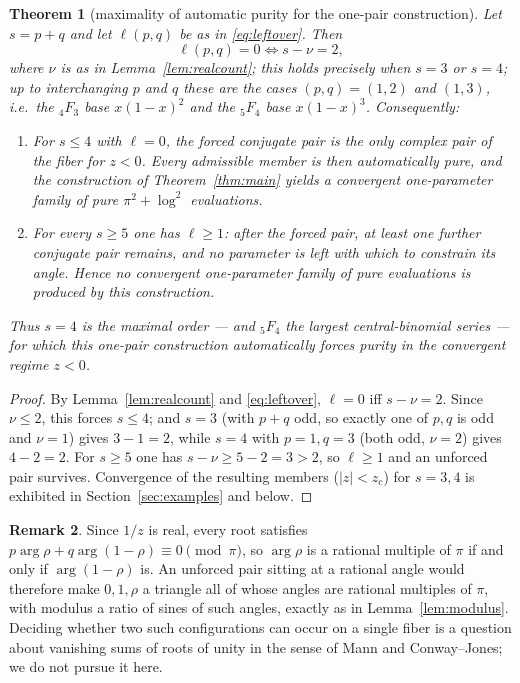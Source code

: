 \documentclass[11pt]{article}
\newtheorem{theorem}{Theorem}
\theoremstyle{definition}
\newtheorem{remark}[theorem]{Remark}
\begin{document}
\begin{theorem}[maximality of automatic purity for the one-pair construction]\label{thm:boundary}
Let $s=p+q$ and let $\ell(p,q)$ be as in \eqref{eq:leftover}. Then
\[
  \ell(p,q)=0 \iff s-\nu=2 ,
\]
where $\nu$ is as in Lemma~\ref{lem:realcount}; this holds precisely when $s=3$ or $s=4$; up to interchanging $p$ and $q$ these are the cases
$(p,q)=(1,2)$ and $(1,3)$, i.e.\ the ${}_4F_3$ base $x(1-x)^2$ and the ${}_5F_4$ base $x(1-x)^3$.
Consequently:
\begin{enumerate}[label=\textup{(\roman*)}]
\item For $s\le4$ with $\ell=0$, the forced conjugate pair is the \emph{only} complex pair of the
fiber for $z<0$. Every admissible member is then automatically pure, and the construction of
Theorem~\ref{thm:main} yields a convergent one-parameter family of pure $\pi^2+\log^2$ evaluations.
\item For every $s\ge5$ one has $\ell\ge1$: after the forced pair, at least one further conjugate
pair remains, and no parameter is left with which to constrain its angle. Hence no convergent
one-parameter family of pure evaluations is produced by this construction.
\end{enumerate}
Thus $s=4$ is the maximal order --- and ${}_5F_4$ the largest central-binomial series --- for which
this one-pair construction \emph{automatically forces} purity in the convergent regime $z<0$.
\end{theorem}

\begin{proof}
By Lemma~\ref{lem:realcount} and \eqref{eq:leftover}, $\ell=0$ iff
$s-\nu=2$. Since $\nu\le2$, this forces $s\le4$; and $s=3$ (with $p+q$ odd, so exactly one of $p,q$
is odd and $\nu=1$) gives $3-1=2$, while $s=4$ with $p=1,q=3$ (both odd, $\nu=2$) gives $4-2=2$. For
$s\ge5$ one has $s-\nu\ge5-2=3>2$, so $\ell\ge1$ and an unforced pair survives.
Convergence of the resulting members ($|z|<z_c$) for $s=3,4$ is exhibited in
Section~\ref{sec:examples} and below.
\end{proof}

\begin{remark}
Since $1/z$ is real, every root satisfies $p\arg\rho+q\arg(1-\rho)\equiv0\pmod\pi$, so $\arg\rho$ is a
rational multiple of $\pi$ if and only if $\arg(1-\rho)$ is. An unforced pair sitting at a rational
angle would therefore make $0,1,\rho$ a triangle all of whose angles are rational multiples of $\pi$,
with modulus a ratio of sines of such angles, exactly as in Lemma~\ref{lem:modulus}. Deciding whether
two such configurations can occur on a single fiber is a question about vanishing sums of roots of
unity in the sense of Mann and Conway--Jones; we do not pursue it here.
\end{remark}
\end{document}

